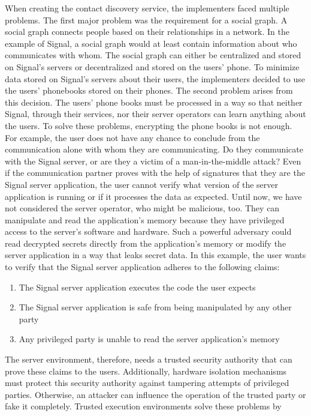 When creating the contact discovery service, the implementers faced multiple
problems. The first major problem was the requirement for a social graph. A
social graph connects people based on their relationships in a network. In the
example of Signal, a social graph would at least contain information about who
communicates with whom. The social graph can either be centralized and stored on
Signal's servers or decentralized and stored on the users' phone. To minimize
data stored on Signal's servers about their users, the implementers decided to
use the users' phonebooks stored on their phones. The second problem arises from
this decision. The users' phone books must be processed in a way so that neither
Signal, through their services, nor their server operators can learn anything
about the users. To solve these problems, encrypting the phone books is not
enough. For example, the user does not have any chance to conclude from the
communication alone with whom they are communicating. Do they communicate with
the Signal server, or are they a victim of a man-in-the-middle attack? Even if
the communication partner proves with the help of signatures that they are the
Signal server application, the user cannot verify what version of the server
application is running or if it processes the data as expected. Until now, we
have not considered the server operator, who might be malicious, too. They can
manipulate and read the application's memory because they have privileged access
to the server's software and hardware. Such a powerful adversary could read
decrypted secrets directly from the application's memory or modify the server
application in a way that leaks secret data. In this example, the user wants to
verify that the Signal server application adheres to the following claims:
\begin{enumerate}
  \item The Signal server application executes the code the user expects
  \item The Signal server application is safe from being manipulated by
    any other party
  \item Any privileged party is unable to read the server application's
    memory
\end{enumerate}
The server environment, therefore, needs a trusted security authority that can
prove these claims to the users. Additionally, hardware isolation mechanisms
must protect this security authority against tampering attempts of privileged
parties. Otherwise, an attacker can influence the operation of the trusted party
or fake it completely. Trusted execution environments solve these problems by
